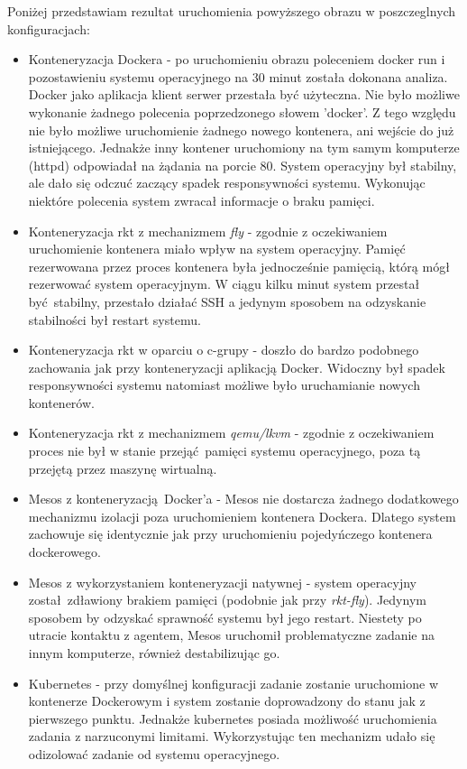 \documentclass[10pt,a4paper,titlepage,twoside]{report}
\begin{document}
Poniżej przedstawiam rezultat uruchomienia powyższego obrazu w poszczeglnych konfiguracjach:
\begin{itemize}
\item Konteneryzacja Dockera - po uruchomieniu obrazu poleceniem docker run i pozostawieniu systemu operacyjnego na 30 minut została dokonana analiza. Docker jako aplikacja klient serwer przestała być użyteczna. Nie było możliwe wykonanie żadnego polecenia poprzedzonego słowem 'docker'. Z tego względu nie było możliwe uruchomienie żadnego nowego kontenera, ani wejście do już istniejącego. Jednakże inny kontener uruchomiony na tym samym komputerze (httpd) odpowiadał na żądania na porcie 80. System operacyjny był stabilny, ale dało się odczuć zaczący spadek responsywności systemu. Wykonując niektóre polecenia system zwracał informacje o braku pamięci.
\item Konteneryzacja rkt z mechanizmem \textit{fly} - zgodnie z oczekiwaniem uruchomienie kontenera miało wpływ na system operacyjny. Pamięć rezerwowana przez proces kontenera była jednocześnie pamięcią, którą mógł rezerwować system operacyjnym. W ciągu kilku minut system przestał być stabilny, przestało działać SSH a jedynym sposobem na odzyskanie stabilności był restart systemu.
\item Konteneryzacja rkt w oparciu o c-grupy - doszło do bardzo podobnego zachowania jak przy konteneryzacji aplikacją Docker. Widoczny był spadek responsywności systemu natomiast możliwe było uruchamianie nowych kontenerów.
\item Konteneryzacja rkt z mechanizmem \textit{qemu/lkvm} - zgodnie z oczekiwaniem proces nie był w stanie przejąć pamięci systemu operacyjnego, poza tą przejętą przez maszynę wirtualną.
\item Mesos z konteneryzacją Docker'a - Mesos nie dostarcza żadnego dodatkowego mechanizmu izolacji poza uruchomieniem kontenera Dockera. Dlatego system zachowuje się identycznie jak przy uruchomieniu pojedyńczego kontenera dockerowego.
\item Mesos z wykorzystaniem konteneryzacji natywnej - system operacyjny został zdławiony brakiem pamięci (podobnie jak przy \textit{rkt-fly}). Jedynym sposobem by odzyskać sprawność systemu był jego restart. Niestety po utracie kontaktu z agentem, Mesos uruchomił problematyczne zadanie na innym komputerze, również destabilizując go.
\item Kubernetes - przy domyślnej konfiguracji zadanie zostanie uruchomione w kontenerze Dockerowym i system zostanie doprowadzony do stanu jak z pierwszego punktu. Jednakże kubernetes posiada możliwość uruchomienia zadania z narzuconymi limitami. Wykorzystując ten mechanizm udało się odizolować zadanie od systemu operacyjnego. 
\end{itemize}
\end{document}
